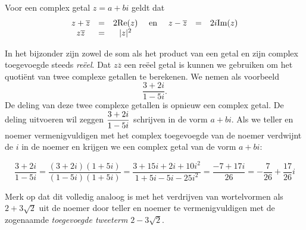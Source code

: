 \documentclass{ximera}
\begin{document}
\begin{proposition}\label{eig:complex_toegevoegde}\nl
Voor een complex getal $z=a+bi$ geldt dat 
$$
\begin{array}{ccc c ccc}
  z + \overline{z} & = & 2\text{Re}(z) & \text{ en }  &
  z - \overline{z} & = & 2i\text{Im}(z) \\
  z\overline{z} & = & |z|^2 & 
  \\
\end{array}
$$
\end{proposition}
In het bijzonder zijn zowel de som als het product van een getal en zijn complex toegevoegde steeds \textit{reëel}. Dat $z\overline{z}$ een reëel getal is kunnen we gebruiken om het quotiënt van twee complexe getallen te berekenen. We nemen als voorbeeld
$$
\frac{3+2i}{1-5i}.
$$
De deling van deze twee complexe getallen is opnieuw een complex getal. De deling uitvoeren wil zeggen $\displaystyle \frac{3+2i}{1-5i}$ schrijven in de vorm $a+bi$. Als we teller en noemer vermenigvuldigen met het complex toegevoegde van de noemer verdwijnt de $i$ in de noemer en krijgen we een complex getal van de vorm $a+bi$:

$$
\frac{3+2i}{1-5i}= \frac{(3+2i)(1+5i)}{(1-5i)(1+5i)}=\frac{3+15i+2i+10 i^2}{1+5i-5i-25 i^2}=\frac{-7+17i}{26}= - \frac{7}{26} + \frac{17}{26}i
$$
 
Merk op dat dit volledig analoog is met het verdrijven van wortelvormen als $2+3\sqrt{2}$ uit de noemer door teller en noemer te vermenigvuldigen met de zogenaamde \textit{toegevoegde tweeterm} $2-3\sqrt{2}$.

% 
\end{document}
